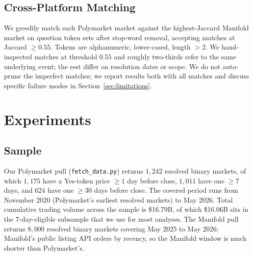\documentclass{article}
\begin{document}
\subsection{Cross-Platform Matching}

We greedily match each Polymarket market against the highest-Jaccard
Manifold market on question token sets after stop-word removal,
accepting matches at Jaccard $\geq 0.55$. Tokens are alphanumeric,
lower-cased, length $> 2$. We hand-inspected matches at threshold
$0.55$ and roughly two-thirds refer to the same underlying event;
the rest differ on resolution dates or scope. We do not auto-prune
the imperfect matches; we report results both with all matches and
discuss specific failure modes in
Section~\ref{sec:limitations}.

\section{Experiments}

\subsection{Sample}

Our Polymarket pull (\texttt{fetch\_data.py}) returns $1{,}242$
resolved binary markets, of which $1{,}175$ have a Yes-token price
$\geq 1$ day before close, $1{,}011$ have one $\geq 7$ days, and
$624$ have one $\geq 30$ days before close. The covered period runs
from November 2020 (Polymarket's earliest resolved markets) to May
2026. Total cumulative trading volume across the sample is
\$16.79B, of which \$16.06B sits in the 7-day-eligible subsample
that we use for most analyses. The Manifold pull returns $8{,}000$
resolved binary markets covering May 2025 to May 2026; Manifold's
public listing API orders by recency, so the Manifold window is much
shorter than Polymarket's.
\end{document}
